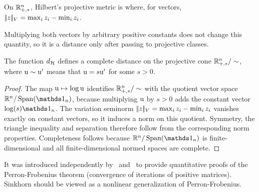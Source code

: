 \begin{defn}\label{def-hilbert-metric}
	On $\mathbb{R}_{+,*}^n$, Hilbert's projective metric is
	where, for vectors, $|\!| z |\!|_V=\max_i z_i-\min_i z_i$.
\end{defn}
Multiplying both vectors by arbitrary positive constants does not change this quantity, so it is a distance only after passing to projective classes.

\begin{prop}
	The function $d_{\mathcal{H}}$ defines a complete distance on the projective cone $\mathbb{R}_{+,*}^n/\sim$, where $\mathrm{u} \sim \mathrm{u}'$ means that $\mathrm{u}=s\mathrm{u}'$ for some $s>0$.
\end{prop}
\begin{proof}
	The map $\mathrm{u} \mapsto \log \mathrm{u}$ identifies $\mathbb{R}_{+,*}^n/\sim$ with the quotient vector space $\RR^n/\Span(\ones_n)$, because multiplying $\mathrm{u}$ by $s>0$ adds the constant vector $\log(s)\ones_n$. The variation seminorm $|\!| z |\!|_V=\max_i z_i-\min_i z_i$ vanishes exactly on constant vectors, so it induces a norm on this quotient. Symmetry, the triangle inequality and separation therefore follow from the corresponding norm properties. Completeness follows because $\RR^n/\Span(\ones_n)$ is finite-dimensional and all finite-dimensional normed spaces are complete.
\end{proof}
%
It was introduced independently by~\cite{birkhoff1957extensions} and~\cite{samelson1957perron} to provide quantitative proofs of the Perron-Frobenius theorem (convergence of iterations of positive matrices). Sinkhorn should be viewed as a nonlinear generalization of Perron-Frobenius.


